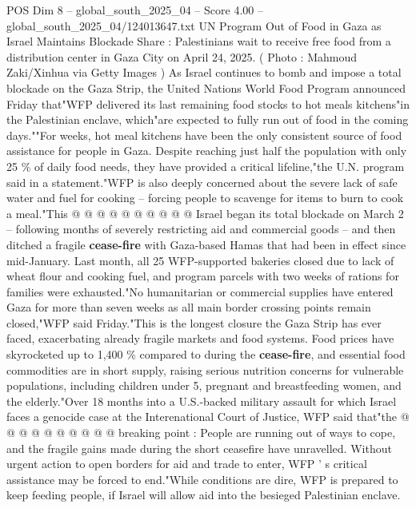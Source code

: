 \begin{textsample}{POS Dim 8 – global\_south\_2025\_04 – Score 4.00 – global\_south\_2025\_04/124013647.txt}  \label{ex:f8_pos_412}
UN Program Out of Food in Gaza as Israel Maintains Blockade Share : Palestinians wait to receive free food from a distribution center in Gaza City on April 24, 2025. ( Photo : Mahmoud Zaki/Xinhua via Getty Images ) As Israel continues to bomb and impose a total blockade on the Gaza Strip, the United Nations World Food Program announced Friday that"WFP delivered its last remaining food stocks to hot meals kitchens"in the Palestinian enclave, which"are expected to fully run out of food in the coming days.""For weeks, hot meal kitchens have been the only consistent source of food assistance for people in Gaza.
Despite reaching just half the population with only 25 \% of daily food needs, they have provided a critical lifeline,"the U.N. program said in a statement."WFP is also deeply concerned about the severe lack of safe water and fuel for cooking -- forcing people to scavenge for items to burn to cook a meal."This @ @ @ @ @ @ @ @ @ @ Israel began its total blockade on March 2 -- following months of severely restricting aid and commercial goods -- and then ditched a fragile \textbf{cease-fire} with Gaza-based Hamas that had been in effect since mid-January.
Last month, all 25 WFP-supported bakeries closed due to lack of wheat flour and cooking fuel, and program parcels with two weeks of rations for families were exhausted."No humanitarian or commercial supplies have entered Gaza for more than seven weeks as all main border crossing points remain closed,"WFP said Friday."This is the longest closure the Gaza Strip has ever faced, exacerbating already fragile markets and food systems.
Food prices have skyrocketed up to 1,400 \% compared to during the \textbf{cease-fire}, and essential food commodities are in short supply, raising serious nutrition concerns for vulnerable populations, including children under 5, pregnant and breastfeeding women, and the elderly."Over 18 months into a U.S.-backed military assault for which Israel faces a genocide case at the Interenational Court of Justice, WFP said that"the @ @ @ @ @ @ @ @ @ @ breaking point : People are running out of ways to cope, and the fragile gains made during the short ceasefire have unravelled.
Without urgent action to open borders for aid and trade to enter, WFP ' s critical assistance may be forced to end."While conditions are dire, WFP is prepared to keep feeding people, if Israel will allow aid into the besieged Palestinian enclave.

\end{textsample}
